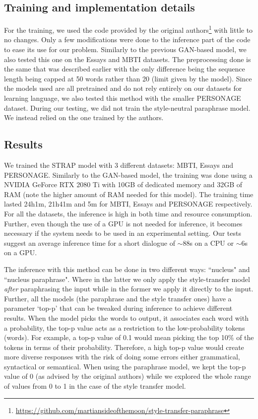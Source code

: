 \documentclass[nomenclature, english, biblatex]{kththesis}
\begin{document}
\subsection{Training and implementation details}
For the training, we used the code provided by the original authors\footnote{\url{https://github.com/martiansideofthemoon/style-transfer-paraphrase}} with little to no changes. Only a few modifications were done to the inference part of the code to ease its use for our problem. Similarly to the previous GAN-based model, we also tested this one on the Essays and MBTI datasets. The preprocessing done is the same that was described earlier with the only difference being the sequence length being capped at 50 words rather than 20 (limit given by the model). Since the models used are all pretrained and do not rely entirely on our datasets for learning language, we also tested this method with the smaller PERSONAGE dataset. During our testing, we did not train the style-neutral paraphrase model. We instead relied on the one trained by the authors.

\subsection{Results}
\label{sec:strap_results}
We trained the STRAP model with 3 different datasets: MBTI, Essays and PERSONAGE. Similarly to the GAN-based model, the training was done using a NVIDIA GeForce RTX 2080 Ti with 10GB of dedicated memory and 32GB of RAM (note the higher amount of RAM needed for this model). The training time lasted 24h1m, 21h41m and 5m for MBTI, Essays and PERSONAGE respectively. For all the datasets, the inference is high in both time and resource consumption. Further, even though the use of a GPU is not needed for inference, it becomes necessary if the system needs to be used in an experimental setting. Our tests suggest an average inference time for a short dialogue of $\sim$88s on a CPU or $\sim$6s on a GPU.

The inference with this method can be done in two different ways: ``nucleus" and ``nucleus paraphrase". Where in the latter we only apply the style-transfer model \textit{after} paraphrasing the input while in the former we apply it directly to the input. Further, all the models (the paraphrase and the style transfer ones) have a parameter `top-p' that can be tweaked during inference to achieve different results. When the model picks the words to output, it associates each word with a probability, the top-p value acts as a restriction to the low-probability tokens (words). For example, a top-p value of 0.1 would mean picking the top 10\% of the tokens in terms of their probability. Therefore, a high top-p value would create more diverse responses with the risk of doing some errors either grammatical, syntactical or semantical. When using the paraphrase model, we kept the top-p value of 0 (as advised by the original authors) while we explored the whole range of values from 0 to 1 in the case of the style transfer model.
\end{document}
